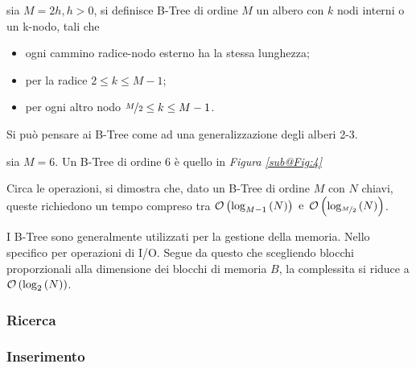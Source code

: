 \documentclass{subfiles}
\begin{document}
\begin{Definition*}
    sia \(M = 2h, h > 0\), si definisce B-Tree di ordine \(M\) un albero con \(k\) nodi interni o un k-nodo,
    tali che
    \begin{itemize}
        \item ogni cammino radice-nodo esterno ha la stessa lunghezza;
        \item per la radice \(2 \le k \le M -1\);
        \item per ogni altro nodo \(\nicefrac{M}{2} \le k \le M -1\).
    \end{itemize}

    \begin{Remark*}
        Si può pensare ai B-Tree come ad una generalizzazione degli alberi 2-3.
    \end{Remark*}
\end{Definition*}
\begin{Example*}
    sia \(M = 6\). Un B-Tree di ordine 6 è quello in \emph{Figura \ref{sub@Fig:4}}
    
\end{Example*}

Circa le operazioni, si dimostra che, dato un B-Tree di ordine \(M\) con \(N\) chiavi,
queste richiedono un tempo compreso tra \(\OrderOf{\Log{N}[M - 1]} \text{e} \OrderOf{\Log{N}[\nicefrac{M}{2}]}\).

\begin{Remark*}
    I B-Tree sono generalmente utilizzati per la gestione della memoria. Nello specifico per operazioni di I/O.
    Segue da questo che scegliendo blocchi proporzionali alla dimensione dei blocchi di memoria \(B\),
    la complessita si riduce a \(\OrderOf{\Log{N}[2]}\).
\end{Remark*}

\subsubsection{Ricerca}


\subsubsection{Inserimento}

\end{document}
